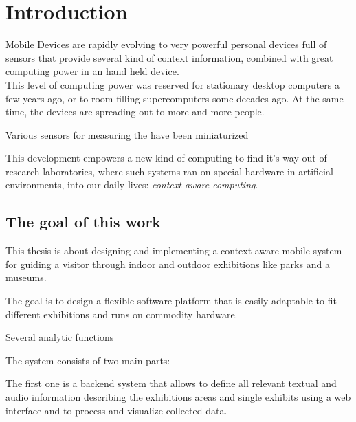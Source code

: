 
\chapter{Introduction} %

\label{introduction} %




Mobile Devices are rapidly evolving to very powerful personal devices full of sensors that provide several kind of context information, combined with great computing power in an hand held device. \\
This level of computing power was reserved for stationary desktop computers a few years ago, or to room filling supercomputers some decades ago.
At the same time, the devices are spreading out to more and more people.

Various sensors for measuring the have been miniaturized 

This development empowers a new kind of computing to find it's way out of research laboratories, where such systems ran on special hardware in artificial environments, into our daily lives: \cite[cf.][]{age-of-context}
\emph{context-aware computing}. 


\section{The goal of this work}

This thesis is about designing and implementing a context-aware mobile system for guiding a visitor through indoor and outdoor exhibitions like parks and a museums.

The goal is to design a flexible software platform that is easily adaptable to fit different exhibitions and runs on commodity hardware. 

Several analytic functions 

The system consists of two main parts:

The first one is a backend system that allows to define all relevant textual and audio information describing the exhibitions areas and single exhibits using a web interface and to process and visualize collected data.

